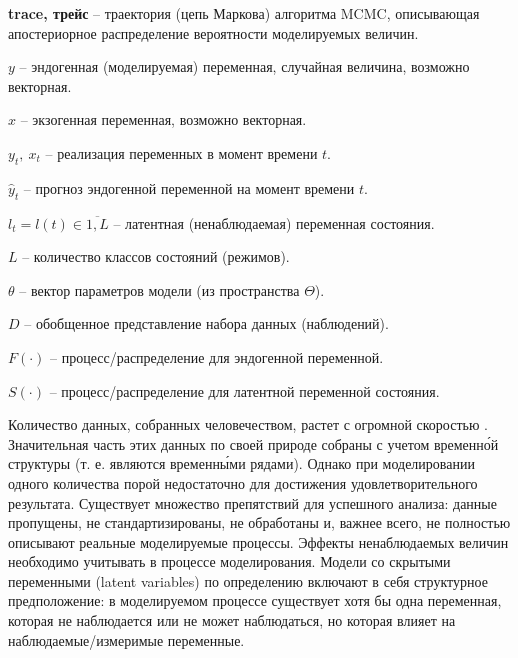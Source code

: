 \documentclass[a4paper,14pt]{extreport}
\begin{document}
\textbf{trace, трейс} -- траектория (цепь Маркова) алгоритма MCMC, описывающая апостериорное распределение вероятности моделируемых величин.



$y$ -- эндогенная (моделируемая) переменная, случайная величина, возможно векторная.

$x$ -- экзогенная переменная, возможно векторная.

$y_t, \: x_t$ -- реализация переменных в момент времени $t$.

$\hat{y}_t$ -- прогноз эндогенной переменной на момент времени $t$.

$l_t = l(t) \in \overline{1,L}$ -- латентная (ненаблюдаемая) переменная состояния.

$L$ -- количество классов состояний (режимов).

$\theta$ -- вектор параметров модели (из пространства $\Theta$).

$D$ -- обобщенное представление набора данных (наблюдений).

$F(\cdot)$ -- процесс/распределение для эндогенной переменной.

$S(\cdot)$ -- процесс/распределение для латентной переменной состояния.



Количество данных, собранных человечеством, растет с огромной скоростью \cite{idc_data_2025}. Значительная часть этих данных по своей природе собраны с учетом временн\'{о}й структуры (т. е. являются временн\'{ы}ми рядами). Однако при моделировании одного количества порой недостаточно для достижения удовлетворительного результата. Существует множество препятствий для успешного анализа: данные пропущены, не стандартизированы, не обработаны и, важнее всего, не полностью описывают реальные моделируемые процессы. Эффекты ненаблюдаемых величин необходимо учитывать в процессе моделирования. Модели со скрытыми переменными (latent variables) по определению включают в себя структурное предположение: в моделируемом процессе существует хотя бы одна переменная, которая не наблюдается или не может наблюдаться, но которая влияет на наблюдаемые/измеримые переменные.
\end{document}
